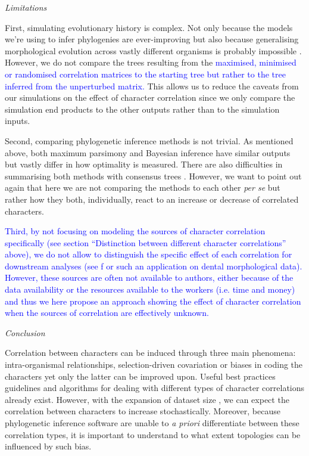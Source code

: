 \documentclass[12pt,letterpaper]{article}
\renewcommand{\subsection}[1]{%
\bigskip
\begin{center}
\begin{large}
\normalfont\itshape #1
\end{large}
\end{center}}
\begin{document}
\subsection{Limitations}
First, simulating evolutionary history is complex.
Not only because the models we're using to infer phylogenies are ever-improving \citep[e.g.][]{heath2014fossilized,Wright01072016} but also because generalising morphological evolution across vastly different organisms is probably impossible \citep[see constrasted discussions from][]{GoloboffEmpirical,OReillyEmpirical}.
However, we do not compare the trees resulting from the \textcolor{blue}{maximised, minimised or randomised correlation matrices to the starting tree but rather to the tree inferred from the unperturbed matrix.}
This allows us to reduce the caveats from our simulations on the effect of character correlation since we only compare the simulation end products to the other outputs rather than to the simulation inputs.
 
Second, comparing phylogenetic inference methods is not trivial.
As mentioned above, both maximum parsimony and Bayesian inference have similar outputs but vastly differ in how optimality is measured.
There are also difficulties in summarising both methods with consensus trees \citep{oReilly2017efficacy}.
However, we want to point out again that here we are not comparing the methods to each other \textit{per se} but rather how they both, individually, react to an increase or decrease of correlated characters.

\textcolor{blue}{Third, by not focusing on modeling the sources of character correlation specifically (see section ``Distinction between different character correlations'' above), we do not allow to distinguish the specific effect of each correlation for downstream analyses (see \citealt{sansom2017dental}f or such an application on dental morphological data).
However, these sources are often not available to authors, either because of the data availability or the resources available to the workers (i.e. time and money) and thus we here propose an approach showing the effect of character correlation when the sources of correlation are effectively unknown.}

\subsection{Conclusion}
Correlation between characters can be induced through three main phenomena: intra-organismal relationships, selection-driven covariation or biases in coding the characters yet only the latter can be improved upon.
Useful best practices guidelines \citep[e.g.][]{Brazeau2011,simoes2017giant} and algorithms for dealing with different types of character correlations \citep[e.g. ][]{de2015parsimony,BrazeauNA} already exist.
However, with the expansion of dataset size \citep[e.g.][> 1000 characters]{nithe2013,O'Leary08022013}, we can expect the correlation between characters to increase stochastically.
Moreover, because phylogenetic inference software are unable to \textit{a priori} differentiate between these correlation types, it is important to understand to what extent topologies can be influenced by such bias.
\end{document}
